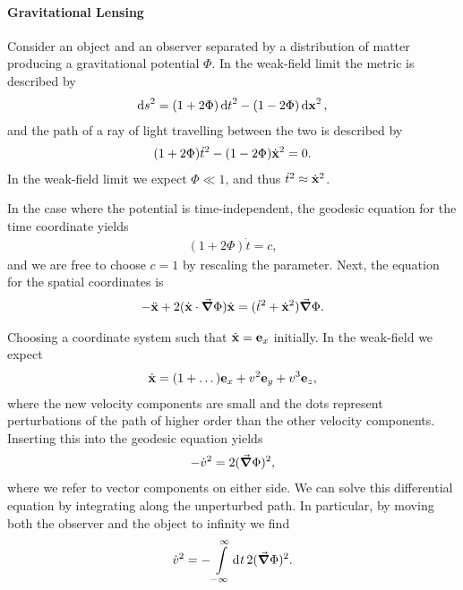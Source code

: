 \paragraph{Gravitational Lensing}
Consider an object and an observer separated by a distribution of matter producing a gravitational potential $\Phi$. In the weak-field limit the metric is described by
\begin{align*}
	\dd{s}^{2} = (1 + 2\Phi)\dd{t}^{2} - (1 - 2\Phi)\dd{\vb{x}}^{2},
\end{align*}
and the path of a ray of light travelling between the two is described by
\begin{align*}
	(1 + 2\Phi)\dot{t}^{2} - (1 - 2\Phi)\dot{\vb{x}}^{2} = 0.
\end{align*}
In the weak-field limit we expect $\Phi \ll 1$, and thus $\dot{t}^{2} \approx \dot{\vb{x}}^{2}$.

In the case where the potential is time-independent, the geodesic equation for the time coordinate yields
\begin{align*}
	(1 + 2\Phi)\dot{t} = c,
\end{align*}
and we are free to choose $c = 1$ by rescaling the parameter. Next, the equation for the spatial coordinates is
\begin{align*}
	-\ddot{\vb{x}} + 2(\dot{\vb{x}}\cdot\grad{\Phi})\dot{\vb{x}} = (\dot{t}^{2} + \dot{\vb{x}}^{2})\grad{\Phi}.
\end{align*}

Choosing a coordinate system such that $\dot{\vb{x}} = \vb{e}_{x}$ initially. In the weak-field we expect
\begin{align*}
	\dot{\vb{x}} = (1 + \dots)\vb{e}_{x} + v^{2}\vb{e}_{y} + v^{3}\vb{e}_{z},
\end{align*}
where the new velocity components are small and the dots represent perturbations of the path of higher order than the other velocity components. Inserting this into the geodesic equation yields
\begin{align*}
	-\dot{v}^{2} = 2(\grad{\Phi})^{2},
\end{align*}
where we refer to vector components on either side. We can solve this differential equation by integrating along the unperturbed path. In particular, by moving both the observer and the object to infinity we find
\begin{align*}
	\dot{v}^{2} = -\int\limits_{-\infty}^{\infty}\dd[]{t}2(\grad{\Phi})^{2}.
\end{align*}